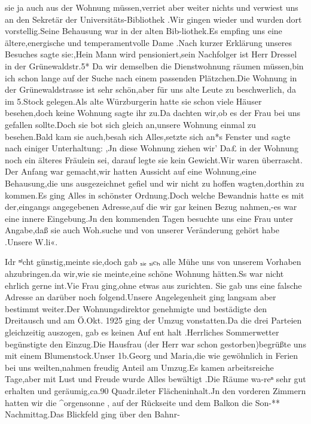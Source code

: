 \documentclass[a4paper,11pt]{article}
\begin{document}
 sie ja auch aus der Wohnung müssen,verriet aber weiter nichts und verwiest uns an den Sekretär der Universitäts-Bibliothek .Wir gingen wieder und wurden dort vorstellig.Seine Behausung war in der alten Bib-liothek.Es empfing uns eine ältere,energische und temperamentvolle Dame .Nach kurzer Erklärung unseres Besuches sagte sie:,Hein Mann wird pensioniert,sein Nachfolger ist Herr Dressel in der Grünewaldstr.5* Da wir demselben die Dienstwohnung räumen müssen,bin ich schon lange auf der Suche nach einem passenden Plätzchen.Die Wohnung in der Grünewaldstrasse ist sehr schön,aber für uns alte Leute zu beschwerlich, da im 5.Stock gelegen.Als alte Würzburgerin hatte sie schon viele Häuser besehen,doch keine Wohnung sagte ihr zu.Da dachten wir,ob es der Frau bei uns gefallen sollte.Doch sie bot sich gleich an,unsere Wohnung einmal zu besehen.Bald kam sie auch,besah sich Alles,setzte sich an*s Fenster und sagte nach einiger Unterhaltung: ,Jn diese Wohnung ziehen wir' Da£ in der Wohnung noch ein älteres Fräulein sei, darauf legte sie kein Gewicht.Wir waren überrascht. Der Anfang war gemacht,wir hatten Aussicht auf eine Wohnung,eine Behausung,die uns ausgezeichnet gefiel und wir nicht zu hoffen wagten,dorthin zu kommen.Es ging Alles in schönster Ordnung.Doch welche Bewandnis hatte es mit der,eingangs angegebenen Adresse,auf die wir gar keinen Bezug nahmen,-es war eine innere Eingebung.Jn den kommenden Tagen besuchte uns eine Frau unter Angabe,daß sie auch Woh.suche und von unserer Veränderung gehört habe .Unsere W.li«.

Idr ⁿⁱcht günstig,meinte sie,doch gab ₛᵢₑ ₛᵢcₕ alle Mühe uns von unserem Vorhaben ahzubringen.da wir,wie sie meinte,eine schöne Wohnung hätten.Ss war nicht ehrlich gerne int.Vie Frau ging,ohne etwas aus zurichten. Sie gab uns eine falsche Adresse an darüber noch folgend.Unsere Angelegenheit ging langsam aber bestimmt weiter.Der Wohnungsdirektor genehmigte und bestädigte den Dreitausch und am Ö.Okt. 1925 ging der Umzug vonstatten.Da die drei Parteien gleichzeitig auszogen, gab es keinen Auf ent halt .Herrliches Sommerwetter begünstigte den Einzug.Die Hausfrau (der Herr war schon gestorben)begrüßte uns mit einem Blumenstock.Unser 1b.Georg und Maria,die wie gewöhnlich in Ferien bei uns weilten,nahmen freudig Anteil am Umzug.Es kamen arbeitsreiche Tage,aber mit Lust und Freude wurde Alles bewältigt .Die Räume wa-reⁿ sehr gut erhalten und geräumig,ca.90 Quadr.ileter Flächeninhalt.Jn den vorderen Zimmern hatten wir die ^orgensonne , auf der Rückseite und dem Balkon die Son-**	Nachmittag.Das Blickfeld ging über den Bahnr-
\end{document}
